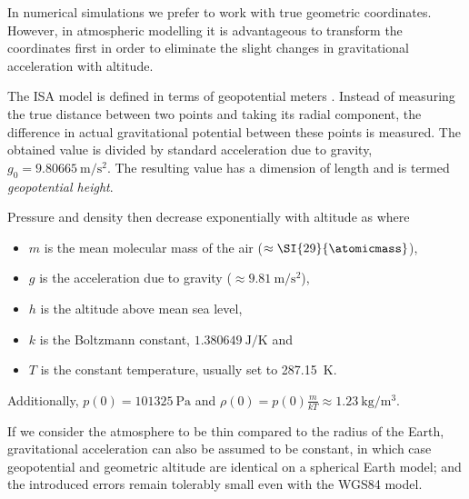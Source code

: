             \begin{example}
                In numerical simulations we prefer to work with true geometric coordinates.
                However, in atmospheric modelling it is advantageous to transform the coordinates first
                in order to eliminate the slight changes in gravitational acceleration with altitude.

                The ISA model is defined in terms of geopotential meters \citep{nasa-isa}.
                Instead of measuring the true distance between two points and taking its radial component,
                the difference in actual gravitational potential between these points
                is measured. The obtained value is divided by standard acceleration due to gravity,
                $g_0 = \SI{9.80665}{\metre\per\second\squared}$. The resulting value has a dimension of length
                and is termed \textit{geopotential height}.
            \end{example}

            Pressure and density then decrease exponentially with altitude as
            where
            \begin{itemize}
                \item $m$ is the mean molecular mass of the air ($\approx \SI{29}{\atomicmass}$),
                \item $g$ is the acceleration due to gravity ($\approx \SI{9.81}{\metre\per\second\squared}$),
                \item $h$ is the altitude above mean sea level,
                \item $k$ is the Boltzmann constant, $\SI{1.380649}{\joule\per\kelvin}$ and
                \item $T$ is the constant temperature, usually set to \SI{287.15}{\kelvin}.
            \end{itemize}

            Additionally, $p(0) = \SI{101325}{\pascal}$ and
            $\rho(0) = p(0) \frac{m}{kT} \approx \SI{1.23}{\kilo\gram\per\cubic\metre}$.

            If we consider the atmosphere to be thin compared to the radius of the Earth,
            gravitational acceleration can also be assumed to be constant, in which case
            geopotential and geometric altitude are identical on a spherical Earth model;
            and the introduced errors remain tolerably small even with the WGS84 model.

